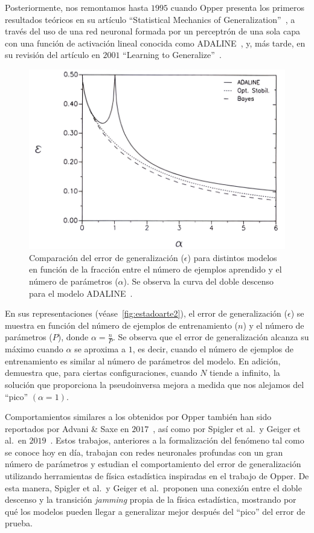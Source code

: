 Posteriormente, nos remontamos hasta $1995$ cuando Opper presenta los primeros resultados teóricos en su artículo ``Statistical Mechanics of Generalization''~\cite{Opper1995}, a través del uso de una red neuronal formada por un perceptrón de una sola capa con una función de activación lineal conocida como ADALINE~\cite{WidrowHoff1960}, y, más tarde, en su revisión del artículo en $2001$ ``Learning to Generalize''~\cite{Opper2001}.\newline

\begin{figure}[h]
    \centering
    \includegraphics[width=0.8\linewidth]{img/estadoarte2.png}
    \caption[Deep Double Descent presente en ADALINE.]{Comparación del error de generalización ($\epsilon$) para distintos modelos en función de la fracción entre el número de ejemplos aprendido y el número de parámetros ($\alpha$). Se observa la curva del doble descenso para el modelo ADALINE~\cite{Opper1995}.}\label{fig:estadoarte2}
\end{figure}

En sus representaciones (véase~\autoref{fig:estadoarte2}), el error de generalización ($\epsilon$) se muestra en función del número de ejemplos de entrenamiento ($n$) y el número de parámetros ($P$), donde $\alpha = \frac{n}{P}$. Se observa que el error de generalización alcanza su máximo cuando $\alpha$ se aproxima a $1$, es decir, cuando el número de ejemplos de entrenamiento es similar al número de parámetros del modelo. En adición, demuestra que, para ciertas configuraciones, cuando $N$ tiende a infinito, la solución que proporciona la pseudoinversa mejora a medida que nos alejamos del ``pico'' $(\alpha = 1)$. \newline

Comportamientos similares a los obtenidos por Opper también han sido reportados por Advani \& Saxe en $2017$~\cite{Advani2017}, así como por Spigler et al.\ y Geiger et al.\ en $2019$~\cite{Spigler2019, Geiger2019}. Estos trabajos, anteriores a la formalización del fenómeno tal como se conoce hoy en día, trabajan con redes neuronales profundas con un gran número de parámetros y estudian el comportamiento del error de generalización utilizando herramientas de física estadística inspiradas en el trabajo de Opper. De esta manera, Spigler et al.\ y Geiger et al.\ proponen una conexión entre el doble descenso y la transición \textit{jamming} propia de la física estadística, mostrando por qué los modelos pueden llegar a generalizar mejor después del ``pico'' del error de prueba.\newline

